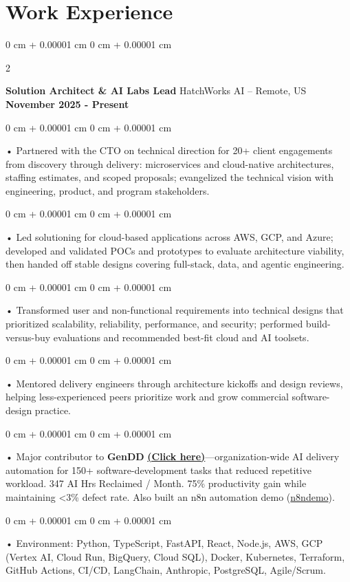 \documentclass[10pt, letterpaper]{article}
\newenvironment{onecolentry}{
    \begin{adjustwidth}{
        0 cm + 0.00001 cm
    }{
        0 cm + 0.00001 cm
    }
}{
    \end{adjustwidth}
} %
\newenvironment{twocolentry}[2][]{
    \onecolentry
    \def\secondColumn{#2}
    \setcolumnwidth{\fill, 4.5 cm}
    \begin{paracol}{2}
}{
    \switchcolumn \raggedleft \secondColumn
    \end{paracol}
    \endonecolentry
} %
\begin{document}
    \vspace{0.5cm}
    \section{Work Experience}
        \vspace{0.1cm}

        \begin{twocolentry}{
            \textbf{November 2025 - Present}
        }
            \textbf{Solution Architect \& AI Labs Lead} HatchWorks AI -- Remote, US\end{twocolentry}

        \begin{onecolentry}
             • Partnered with the CTO on technical direction for 20+ client engagements from discovery through delivery: microservices and cloud-native architectures, staffing estimates, and scoped proposals; evangelized the technical vision with engineering, product, and program stakeholders.
        \end{onecolentry}
        \begin{onecolentry}
             • Led solutioning for cloud-based applications across AWS, GCP, and Azure; developed and validated POCs and prototypes to evaluate architecture viability, then handed off stable designs covering full-stack, data, and agentic engineering.
        \end{onecolentry}
        \begin{onecolentry}
             • Transformed user and non-functional requirements into technical designs that prioritized scalability, reliability, performance, and security; performed build-versus-buy evaluations and recommended best-fit cloud and AI toolsets.
        \end{onecolentry}
        \begin{onecolentry}
             • Mentored delivery engineers through architecture kickoffs and design reviews, helping less-experienced peers prioritize work and grow commercial software-design practice.
        \end{onecolentry}
        \begin{onecolentry}
             • Major contributor to \textbf{GenDD} \href{https://hatchworks.com/generative-driven-development/}{\textbf{(Click here)}}---organization-wide AI delivery automation for 150+ software-development tasks that reduced repetitive workload. 347 AI Hrs Reclaimed / Month. 75\% productivity gain while maintaining {<}3\% defect rate. Also built an n8n automation demo (\href{https://github.com/sreenikethaathreya-hw/n8ndemo}{n8ndemo}).
        \end{onecolentry}
        \begin{onecolentry}
             • Environment: Python, TypeScript, FastAPI, React, Node.js, AWS, GCP (Vertex AI, Cloud Run, BigQuery, Cloud SQL), Docker, Kubernetes, Terraform, GitHub Actions, CI/CD, LangChain, Anthropic, PostgreSQL, Agile/Scrum.
        \end{onecolentry}
\end{document}
